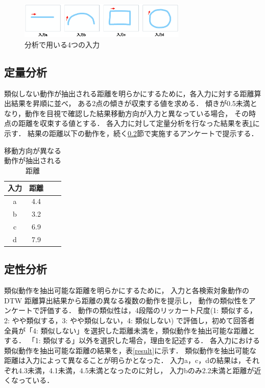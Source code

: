 \documentclass[twocolumn]{jarticle} %
\begin{document}
\begin{figure}[H]
    \centering
    \includegraphics[width=8cm]{resume-input.eps}
    \caption{分析で用いる4つの入力}
    \label{systemdisplay}
\end{figure}

\subsection{定量分析}
\label{teiryou}
類似しない動作が抽出される距離を明らかにするために，各入力に対する距離算出結果を昇順に並べ，
ある2点の傾きが収束する値を求める．
傾きが0.5未満となり，動作を目視で確認した結果移動方向が入力と異なっている場合，
その時点の距離を収束する値とする．
各入力に対して定量分析を行なった結果を表\ref{quantitativeresult}に示す．
結果の距離以下の動作を，続く\ref{teisei}節で実施するアンケートで提示する．
        
\begin{table}
    \caption{移動方向が異なる動作が抽出される距離}
    \label{quantitativeresult}
    \centering
    \begin{tabular}{c|c|c|c}
    \hline
    入力 & 距離 \\
    \hline \hline
    a & 4.4 \\
    \hline
    b & 3.2 \\
    \hline
    c & 6.9 \\
    \hline
    d & 7.9 \\
    \hline
    \end{tabular}
\end{table}

\subsection{定性分析}
\label{teisei}
類似動作を抽出可能な距離を明らかにするために，
入力と各検索対象動作の DTW 距離算出結果から距離の異なる複数の動作を提示し，
動作の類似性をアンケートで評価する．
動作の類似性は，4段階のリッカート尺度(1: 類似する，2: やや類似する，3: やや類似しない，4: 類似しない)
で評価し，初めて回答者全員が「4: 類似しない」を選択した距離未満を，類似動作を抽出可能な距離とする．
「1: 類似する」以外を選択した場合，理由を記述する．
各入力における類似動作を抽出可能な距離の結果を，表\ref{result}に示す．
類似動作を抽出可能な距離は入力によって異なることが明らかとなった．
入力a，c，dの結果は，それぞれ4.3未満，4.1未満，4.5未満となったのに対し，
入力bのみ2.2未満と距離が近くなっている．
\end{document}
